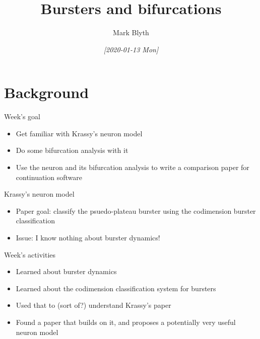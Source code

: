 \documentclass[,aspectratio=169]{beamer}
\author{Mark Blyth}
\date{\textit{[2020-01-13 Mon]}}
\title{Bursters and bifurcations}
\begin{document}
\maketitle

\section{Background}
\label{sec:orga91d19a}
\begin{frame}[label={sec:orge5001db}]{Week's goal}
\begin{itemize}
\item Get familiar with Krassy's neuron model
\item Do some bifurcation analysis with it
\item Use the neuron and its bifurcation analysis to write a comparison paper for continuation software
\end{itemize}
\end{frame}

\begin{frame}[label={sec:org5db8028}]{Krassy's neuron model}
\begin{itemize}
\item Paper goal: classify the psuedo-plateau burster using the codimension burster classification
\item Issue: I know nothing about burster dynamics!
\end{itemize}
\end{frame}

\begin{frame}[label={sec:org62edc31}]{Week's activities}
\begin{itemize}
\item Learned about burster dynamics
\item Learned about the codimension classification system for bursters
\item Used that to (sort of?) understand Krassy's paper
\item Found a paper that builds on it, and proposes a potentially very useful neuron model
\end{itemize}
\end{frame}
\end{document}
